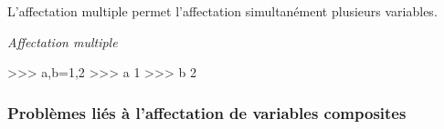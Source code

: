 \documentclass[11pt,oneside]{article}
\begin{document}
L'affectation multiple permet l'affectation simultanément plusieurs variables.

\begin{exemple}
\textit{Affectation multiple}


\begin{minipage}[c]{.55\linewidth}
\begin{py}
\begin{python}
>>> a,b=1,2
>>> a
    1
>>> b
    2
\end{python}
\end{py}
\end{minipage}

\end{exemple}


\subsubsection{Problèmes liés à l'affectation de variables composites}
\end{document}
